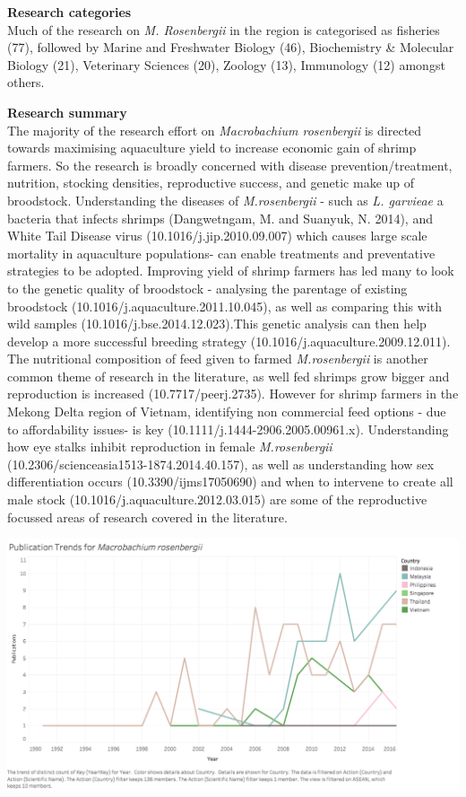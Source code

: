 \documentclass[]{book}
\theoremstyle{definition}
\theoremstyle{definition}
\theoremstyle{definition}
\theoremstyle{remark}
\begin{document}
\textbf{Research categories}\\
Much of the research on \emph{M. Rosenbergii} in the region is
categorised as fisheries (77), followed by Marine and Freshwater Biology
(46), Biochemistry \& Molecular Biology (21), Veterinary Sciences (20),
Zoology (13), Immunology (12) amongst others.

\textbf{Research summary}\\
The majority of the research effort on \emph{Macrobachium rosenbergii}
is directed towards maximising aquaculture yield to increase economic
gain of shrimp farmers. So the research is broadly concerned with
disease prevention/treatment, nutrition, stocking densities,
reproductive success, and genetic make up of broodstock. Understanding
the diseases of \emph{M.rosenbergii} - such as \emph{L. garvieae} a
bacteria that infects shrimps (Dangwetngam, M. and Suanyuk, N. 2014),
and White Tail Disease virus (10.1016/j.jip.2010.09.007) which causes
large scale mortality in aquaculture populations- can enable treatments
and preventative strategies to be adopted. Improving yield of shrimp
farmers has led many to look to the genetic quality of broodstock -
analysing the parentage of existing broodstock
(10.1016/j.aquaculture.2011.10.045), as well as comparing this with wild
samples (10.1016/j.bse.2014.12.023).This genetic analysis can then help
develop a more successful breeding strategy
(10.1016/j.aquaculture.2009.12.011). The nutritional composition of feed
given to farmed \emph{M.rosenbergii} is another common theme of research
in the literature, as well fed shrimps grow bigger and reproduction is
increased (10.7717/peerj.2735). However for shrimp farmers in the Mekong
Delta region of Vietnam, identifying non commercial feed options - due
to affordability issues- is key (10.1111/j.1444-2906.2005.00961.x).
Understanding how eye stalks inhibit reproduction in female
\emph{M.rosenbergii} (10.2306/scienceasia1513-1874.2014.40.157), as well
as understanding how sex differentiation occurs (10.3390/ijms17050690)
and when to intervene to create all male stock
(10.1016/j.aquaculture.2012.03.015) are some of the reproductive
focussed areas of research covered in the literature.

\includegraphics{images_species/Publication trend for Macrobachium rosenbergii.png}
\end{document}
